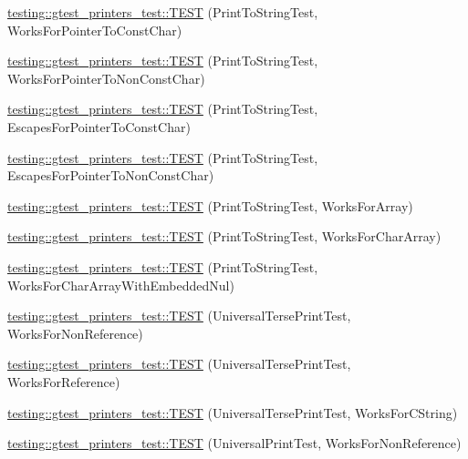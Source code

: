 \begin{DoxyCompactItemize}
\item 
\hyperlink{namespacetesting_1_1gtest__printers__test_a68100148758516ebab9c761ca7778586}{testing\+::gtest\+\_\+printers\+\_\+test\+::\+T\+E\+ST} (Print\+To\+String\+Test, Works\+For\+Pointer\+To\+Const\+Char)
\item 
\hyperlink{namespacetesting_1_1gtest__printers__test_a1db34d8760c17157572ce2877007d15a}{testing\+::gtest\+\_\+printers\+\_\+test\+::\+T\+E\+ST} (Print\+To\+String\+Test, Works\+For\+Pointer\+To\+Non\+Const\+Char)
\item 
\hyperlink{namespacetesting_1_1gtest__printers__test_ab8fce4287e837cfcd851ded56b62f9ce}{testing\+::gtest\+\_\+printers\+\_\+test\+::\+T\+E\+ST} (Print\+To\+String\+Test, Escapes\+For\+Pointer\+To\+Const\+Char)
\item 
\hyperlink{namespacetesting_1_1gtest__printers__test_a7203081ef422f0835643d2c54b8ebf28}{testing\+::gtest\+\_\+printers\+\_\+test\+::\+T\+E\+ST} (Print\+To\+String\+Test, Escapes\+For\+Pointer\+To\+Non\+Const\+Char)
\item 
\hyperlink{namespacetesting_1_1gtest__printers__test_a78bd89af8a8505880b78ec2a001d3cb8}{testing\+::gtest\+\_\+printers\+\_\+test\+::\+T\+E\+ST} (Print\+To\+String\+Test, Works\+For\+Array)
\item 
\hyperlink{namespacetesting_1_1gtest__printers__test_ad122dc21e7ebad023d7048ef117a1129}{testing\+::gtest\+\_\+printers\+\_\+test\+::\+T\+E\+ST} (Print\+To\+String\+Test, Works\+For\+Char\+Array)
\item 
\hyperlink{namespacetesting_1_1gtest__printers__test_a65e208358dddc7747f4519410c71d877}{testing\+::gtest\+\_\+printers\+\_\+test\+::\+T\+E\+ST} (Print\+To\+String\+Test, Works\+For\+Char\+Array\+With\+Embedded\+Nul)
\item 
\hyperlink{namespacetesting_1_1gtest__printers__test_ab49ff6527b0b01411b725fe46e1af65c}{testing\+::gtest\+\_\+printers\+\_\+test\+::\+T\+E\+ST} (Universal\+Terse\+Print\+Test, Works\+For\+Non\+Reference)
\item 
\hyperlink{namespacetesting_1_1gtest__printers__test_ab7adb58a0e08e0830157a5a1c7bceac5}{testing\+::gtest\+\_\+printers\+\_\+test\+::\+T\+E\+ST} (Universal\+Terse\+Print\+Test, Works\+For\+Reference)
\item 
\hyperlink{namespacetesting_1_1gtest__printers__test_ab11252e228a240a349d747546bc222d2}{testing\+::gtest\+\_\+printers\+\_\+test\+::\+T\+E\+ST} (Universal\+Terse\+Print\+Test, Works\+For\+C\+String)
\item 
\hyperlink{namespacetesting_1_1gtest__printers__test_a43d4efc91c2ea7d8220891df9b0437df}{testing\+::gtest\+\_\+printers\+\_\+test\+::\+T\+E\+ST} (Universal\+Print\+Test, Works\+For\+Non\+Reference)

\end{DoxyCompactItemize}
